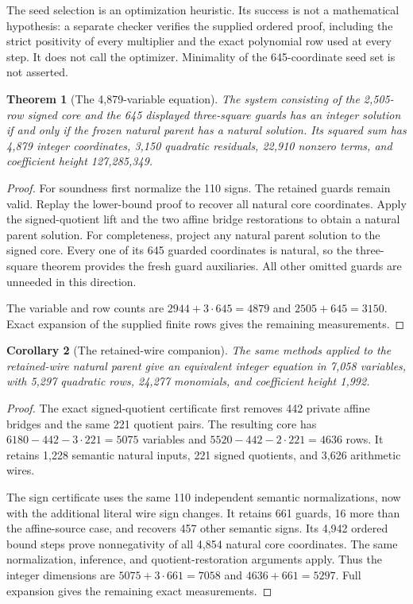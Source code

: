 \documentclass[11pt,letterpaper]{article}
\newtheorem{theorem}{Theorem}[section]
\newtheorem{corollary}[theorem]{Corollary}
\theoremstyle{definition}
\begin{document}
The seed selection is an optimization heuristic. Its success is not a
mathematical hypothesis: a separate checker verifies the supplied
ordered proof, including the strict positivity of every multiplier and
the exact polynomial row used at every step. It does not call the
optimizer. Minimality of the 645-coordinate seed set is not asserted.

\begin{theorem}[The 4,879-variable equation]
\label{thm:guarded}
The system consisting of the 2,505-row signed core and the 645 displayed
three-square guards has an integer solution if and only if the frozen
natural parent has a natural solution. Its squared sum has 4,879
integer coordinates, 3,150 quadratic residuals, 22,910 nonzero terms,
and coefficient height 127,285,349.
\end{theorem}
\begin{proof}
For soundness first normalize the 110 signs. The retained guards remain
valid. Replay the lower-bound proof to recover all natural core
coordinates. Apply the signed-quotient lift and the two affine bridge
restorations to obtain a natural parent solution. For completeness,
project any natural parent solution to the signed core. Every one of
its 645 guarded coordinates is natural, so the three-square theorem
provides the fresh guard auxiliaries. All other omitted guards are
unneeded in this direction.

The variable and row counts are
$2944+3\cdot645=4879$ and $2505+645=3150$. Exact expansion of the
supplied finite rows gives the remaining measurements.
\end{proof}

\begin{corollary}[The retained-wire companion]
\label{cor:retained}
The same methods applied to the retained-wire natural parent give an
equivalent integer equation in 7,058 variables, with 5,297 quadratic
rows, 24,277 monomials, and coefficient height 1,992.
\end{corollary}
\begin{proof}
The exact signed-quotient certificate first removes 442 private affine
bridges and the same 221 quotient pairs. The resulting core has
$6180-442-3\cdot221=5075$ variables and
$5520-442-2\cdot221=4636$ rows. It retains 1,228 semantic natural
inputs, 221 signed quotients, and 3,626 arithmetic wires.

The sign certificate uses the same 110 independent semantic
normalizations, now with the additional literal wire sign changes.
It retains 661 guards, 16 more than the affine-source case, and
recovers 457 other semantic signs. Its 4,942 ordered bound steps prove
nonnegativity of all 4,854 natural core coordinates. The same
normalization, inference, and quotient-restoration arguments apply.
Thus the integer dimensions are $5075+3\cdot661=7058$ and
$4636+661=5297$. Full expansion gives the remaining exact measurements.
\end{proof}
\end{document}
